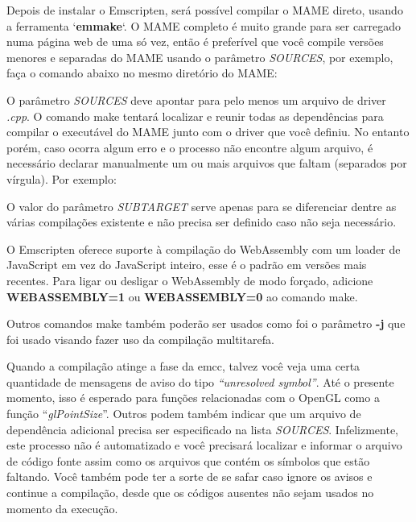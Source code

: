 \documentclass[letterpaper,10pt,brazil]{sphinxmanual}
\begin{document}
Depois de instalar o Emscripten, será possível compilar o MAME direto,
usando a ferramenta `\textbf{emmake}`. O MAME completo é muito grande para
ser carregado numa página web de uma só vez, então é preferível que você
compile versões menores e separadas do MAME usando o parâmetro
\emph{SOURCES}, por exemplo, faça o comando abaixo no mesmo diretório do MAME:
\begin{quote}

\end{quote}

O parâmetro \emph{SOURCES} deve apontar para pelo menos um arquivo de driver
\emph{.cpp}. O comando make tentará localizar e reunir todas as dependências
para compilar o executável do MAME junto com o driver que você
definiu. No entanto porém, caso ocorra algum erro e o processo não
encontre algum arquivo, é necessário declarar manualmente um ou mais
arquivos que faltam (separados por vírgula). Por exemplo:

\begin{DUlineblock}{0em}
\item[] 
\end{DUlineblock}

O valor do parâmetro \emph{SUBTARGET} serve apenas para se diferenciar dentre
as várias compilações existente e não precisa ser definido caso não seja
necessário.

O Emscripten oferece suporte à compilação do WebAssembly com um loader
de JavaScript em vez do JavaScript inteiro, esse é o padrão em versões
mais recentes. Para ligar ou desligar o WebAssembly de modo forçado,
adicione \textbf{WEBASSEMBLY=1} ou \textbf{WEBASSEMBLY=0} ao comando make.

Outros comandos make também poderão ser usados como foi o
parâmetro \textbf{-j} que foi usado visando fazer uso da compilação
multitarefa.

Quando a compilação atinge a fase da emcc, talvez você veja uma
certa quantidade de mensagens de aviso do tipo \emph{``unresolved symbol''}.
Até o presente momento, isso é esperado para funções relacionadas com o
OpenGL como a função ``\emph{glPointSize}''. Outros podem também indicar que um
arquivo de dependência adicional precisa ser especificado na lista
\emph{SOURCES}. Infelizmente, este processo não é automatizado e você
precisará localizar e informar o arquivo de código fonte assim como os
arquivos que contém os símbolos que estão faltando. Você também pode
ter a sorte de se safar caso ignore os avisos e continue a compilação,
desde que os códigos ausentes não sejam usados no momento da execução.
\end{document}
